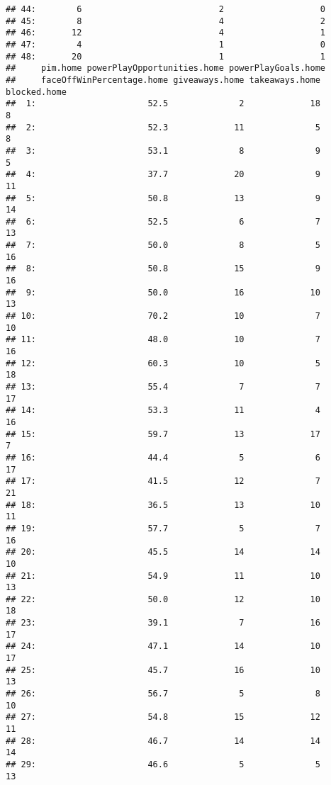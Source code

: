\documentclass[
]{article}
\begin{document}
\begin{verbatim}
## 44:        6                           2                   0
## 45:        8                           4                   2
## 46:       12                           4                   1
## 47:        4                           1                   0
## 48:       20                           1                   1
##     pim.home powerPlayOpportunities.home powerPlayGoals.home
##     faceOffWinPercentage.home giveaways.home takeaways.home blocked.home
##  1:                      52.5              2             18            8
##  2:                      52.3             11              5            8
##  3:                      53.1              8              9            5
##  4:                      37.7             20              9           11
##  5:                      50.8             13              9           14
##  6:                      52.5              6              7           13
##  7:                      50.0              8              5           16
##  8:                      50.8             15              9           16
##  9:                      50.0             16             10           13
## 10:                      70.2             10              7           10
## 11:                      48.0             10              7           16
## 12:                      60.3             10              5           18
## 13:                      55.4              7              7           17
## 14:                      53.3             11              4           16
## 15:                      59.7             13             17            7
## 16:                      44.4              5              6           17
## 17:                      41.5             12              7           21
## 18:                      36.5             13             10           11
## 19:                      57.7              5              7           16
## 20:                      45.5             14             14           10
## 21:                      54.9             11             10           13
## 22:                      50.0             12             10           18
## 23:                      39.1              7             16           17
## 24:                      47.1             14             10           17
## 25:                      45.7             16             10           13
## 26:                      56.7              5              8           10
## 27:                      54.8             15             12           11
## 28:                      46.7             14             14           14
## 29:                      46.6              5              5           13

\end{verbatim}
\end{document}
